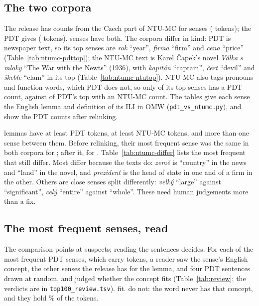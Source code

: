 \documentclass[a4paper,12pt]{article}
\begin{document}
\subsection{The two corpora}

The release has counts from the Czech part of
NTU-MC for  senses (
tokens); the PDT gives  (
tokens).   senses have both.  The corpora differ
in kind: PDT is newspaper text, so its top senses are \textit{rok}
``year'', \textit{firma} ``firm'' and \textit{cena} ``price''
(Table~\ref{tab:ntumc-pdttop}); the NTU-MC text is Karel Čapek's novel
\textit{Válka s mloky} ``The War with the Newts'' (1936), with
\textit{kapitán} ``captain'', \textit{čert} ``devil'' and \textit{škeble}
``clam'' in its top  (Table~\ref{tab:ntumc-ntutop}).
NTU-MC also tags pronouns and function words, which PDT does not, so only
 of its top  senses has a PDT
count, against  of PDT's top 
with an NTU-MC count.  The tables give each sense the English lemma and
definition of its ILI in OMW (\texttt{pdt\_vs\_ntumc.py}), and show the
PDT counts after relinking.

 lemmas have at least 
PDT tokens, at least  NTU-MC tokens, and more
than one sense between them.  Before relinking, their most frequent sense
was the same in both corpora for ; after it, for
.  Table~\ref{tab:ntumc-differ} lists the most
frequent that still differ.  Most differ because the texts do:
\textit{země} is ``country'' in the news and ``land'' in the novel, and
\textit{prezident} is the head of state in one and of a firm in the
other.  Others are close senses split differently: \textit{velký}
``large'' against ``significant'', \textit{celý} ``entire'' against
``whole''.  These need human judgements more than a fix.

\subsection{The most frequent senses, read}

The comparison points at suspects; reading the sentences decides.  For
each of the  most frequent PDT senses, which
carry  tokens, a reader saw the sense's English
concept, the other senses the release has for the lemma, and four PDT
sentences drawn at random, and judged whether the concept fits
(Table~\ref{tab:review}; the verdicts are in \texttt{top100\_review.tsv}).
 fit.   do not:
the word never has that concept, and they hold
\% of the tokens.
\end{document}

